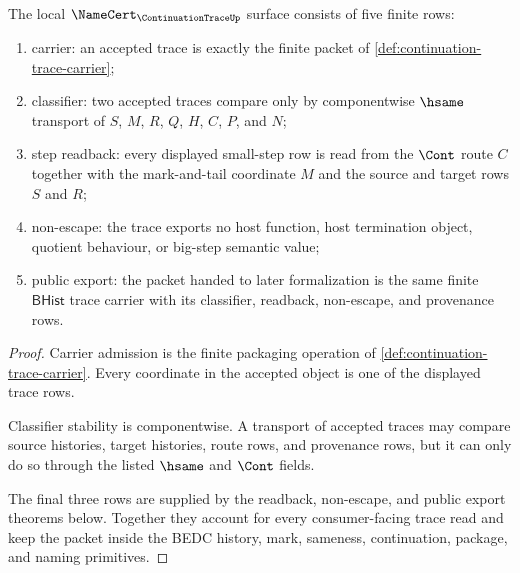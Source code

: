 \begin{theorem}
\label{thm:continuation-trace-namecert-obligations}
The local $\NameCert_{\ContinuationTraceUp}$ surface consists of five finite rows:
\begin{enumerate}
\item carrier: an accepted trace is exactly the finite packet of \autoref{def:continuation-trace-carrier};
\item classifier: two accepted traces compare only by componentwise $\hsame$ transport of $S$, $M$, $R$, $Q$, $H$, $C$, $P$, and $N$;
\item step readback: every displayed small-step row is read from the $\Cont$ route $C$ together with the mark-and-tail coordinate $M$ and the source and target rows $S$ and $R$;
\item non-escape: the trace exports no host function, host termination object, quotient behaviour, or big-step semantic value;
\item public export: the packet handed to later formalization is the same finite $\mathsf{BHist}$ trace carrier with its classifier, readback, non-escape, and provenance rows.
\end{enumerate}
\end{theorem}
\begin{proof}
Carrier admission is the finite packaging operation of \autoref{def:continuation-trace-carrier}. Every coordinate in the accepted object is one of the displayed trace rows.

Classifier stability is componentwise. A transport of accepted traces may compare source histories, target histories, route rows, and provenance rows, but it can only do so through the listed $\hsame$ and $\Cont$ fields.

The final three rows are supplied by the readback, non-escape, and public export theorems below. Together they account for every consumer-facing trace read and keep the packet inside the BEDC history, mark, sameness, continuation, package, and naming primitives.
\end{proof}

